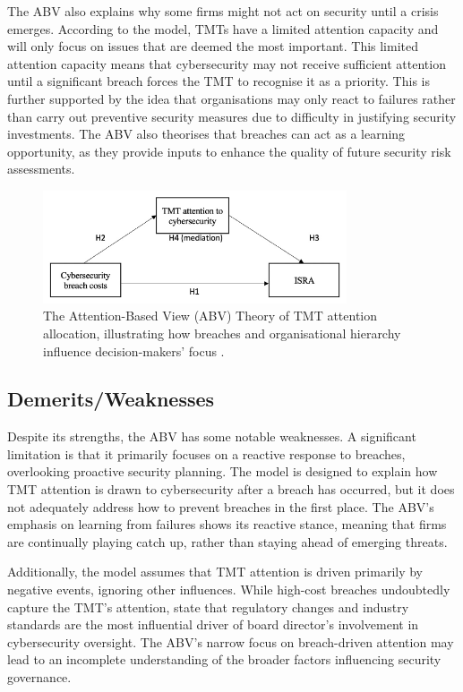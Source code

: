     The ABV also explains why some firms might not act on security until a crisis emerges. According to the model, TMTs have a limited attention capacity and will only focus on issues that are deemed the most important. This limited attention capacity means that cybersecurity may not receive sufficient attention until a significant breach forces the TMT to recognise it as a priority. This is further supported by the idea that organisations may only react to failures rather than carry out preventive security measures due to difficulty in justifying security investments. The ABV also theorises that breaches can act as a learning opportunity, as they provide inputs to enhance the quality of future security risk assessments.

    \begin{figure}[htbp]
        \centering
        \includegraphics[width=0.8\textwidth]{figures/ABV-Theory.png}
        \caption{The Attention-Based View (ABV) Theory of TMT attention allocation, illustrating how breaches and organisational hierarchy influence decision-makers' focus \citep{shaikh2023information}.}
        \label{fig:ABV}
    \end{figure}

    \subsection{Demerits/Weaknesses}
    Despite its strengths, the ABV has some notable weaknesses. A significant limitation is that it primarily focuses on a reactive response to breaches, overlooking proactive security planning. The model is designed to explain how TMT attention is drawn to cybersecurity after a breach has occurred, but it does not adequately address how to prevent breaches in the first place. The ABV's emphasis on learning from failures shows its reactive stance, meaning that firms are continually playing catch up, rather than staying ahead of emerging threats.

    Additionally, the model assumes that TMT attention is driven primarily by negative events, ignoring other influences. While high-cost breaches undoubtedly capture the TMT's attention, \citet{gale2022governing} state that regulatory changes and industry standards are the most influential driver of board director's involvement in cybersecurity oversight. The ABV's narrow focus on breach-driven attention may lead to an incomplete understanding of the broader factors influencing security governance.

